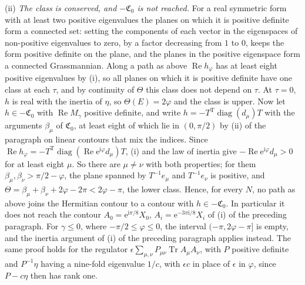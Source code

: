 (ii) \emph{The class is conserved, and \(-\mathfrak C_0\) is not reached.} For a real symmetric form with at least two positive eigenvalues the planes on which it is positive definite form a connected set: setting the components of each vector in the eigenspaces of non-positive eigenvalues to zero, by a factor decreasing from \(1\) to \(0\), keeps the form positive definite on the plane, and the planes in the positive eigenspace form a connected Grassmannian. Along a path as above \(\operatorname{Re}h_\varphi\) has at least eight positive eigenvalues by (i), so all planes on which it is positive definite have one class at each \(\tau\), and by continuity of \(\Theta\) this class does not depend on \(\tau\). At \(\tau=0\), \(h\) is real with the inertia of \(\eta\), so \(\Theta(E)=2\varphi\) and the class is upper. Now let \(h\in-\mathfrak C_0\) with \(\operatorname{Re}M_\gamma\) positive definite, and write \(h=-T^{\mathrm T}\operatorname{diag}(d_\mu)T\) with the arguments \(\beta_\mu\) of \(\mathfrak C_0\), at least eight of which lie in \((0,\pi/2)\) by (ii) of the paragraph on linear contours that mix the indices. Since \(\operatorname{Re}h_\varphi=-T^{\mathrm T}\operatorname{diag}(\operatorname{Re}\mathrm e^{\mathrm i\varphi}d_\mu)T\), (i) and the law of inertia give \(-\operatorname{Re}\mathrm e^{\mathrm i\varphi}d_\mu>0\) for at least eight \(\mu\). So there are \(\mu\neq\nu\) with both properties; for them \(\beta_\mu,\beta_\nu>\pi/2-\varphi\), the plane spanned by \(T^{-1}e_\mu\) and \(T^{-1}e_\nu\) is positive, and \(\Theta=\beta_\mu+\beta_\nu+2\varphi-2\pi<2\varphi-\pi\), the lower class. Hence, for every \(N\), no path as above joins the Hermitian contour to a contour with \(h\in-\mathfrak C_0\). In particular it does not reach the contour \(A_0=\mathrm e^{\mathrm i\pi/8}X_0\), \(A_i=\mathrm e^{-3\pi\mathrm i/8}X_i\) of (i) of the preceding paragraph. For \(\gamma\le0\), where \(-\pi/2\le\varphi\le0\), the interval \((-\pi,2\varphi-\pi]\) is empty, and the inertia argument of (i) of the preceding paragraph applies instead. The same proof holds for the regulator \(\epsilon\sum_{\mu,\nu}P_{\mu\nu}\operatorname{Tr}A_\mu A_\nu\), with \(P\) positive definite and \(P^{-1}\eta\) having a nine-fold eigenvalue \(1/c\), with \(\epsilon c\) in place of \(\epsilon\) in \(\varphi\), since \(P-c\eta\) then has rank one.

